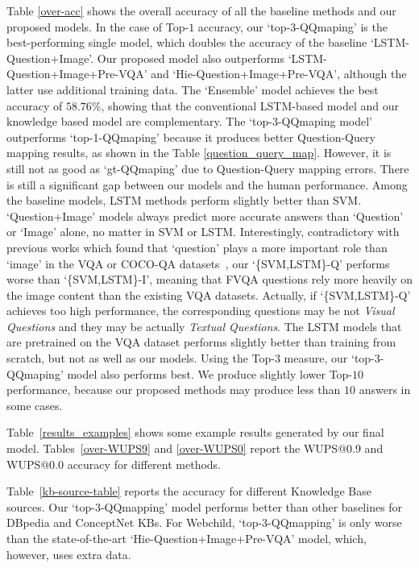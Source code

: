 \documentclass[10pt,journal]{IEEEtran}
\def\bluetext{}
\begin{document}
Table \ref{over-acc} shows the overall accuracy of all the baseline methods and our proposed models. In the case of Top-$1$ accuracy, our `{top-3-QQmaping}' is the best-performing single model, which doubles the accuracy of the baseline `LSTM-Question+Image'. {Our proposed model also outperforms `LSTM-Question+Image+Pre-VQA' and `Hie-Question+Image+Pre-VQA', although the latter use additional training data. The `Ensemble' model achieves the best accuracy of $58.76\%$, showing that the conventional LSTM-based model and our knowledge based model are complementary.} The `top-3-QQmaping model' outperforms `top-1-QQmaping' because it produces better Question-Query mapping results, as shown in the Table \ref{question_query_map}. However, it is still not as good as `gt-QQmaping' due to Question-Query mapping errors. There is still a significant gap between our models and the human performance. Among the baseline models, LSTM methods perform slightly better than SVM. `Question+Image' models always predict more accurate answers than `Question' or `Image' alone, no matter in SVM or LSTM. Interestingly, contradictory with previous works \cite{ren2015image,antol2015vqa} which found that `question' plays a more important role than `image' in the VQA \cite{antol2015vqa} or COCO-QA datasets~\cite{ren2015image}, our `\{SVM,LSTM\}-Q' performs worse than `\{SVM,LSTM\}-I', meaning that FVQA questions rely more heavily on the image content than the existing VQA datasets. Actually, if `\{SVM,LSTM\}-Q' achieves too high performance, the corresponding questions may be not \textit{Visual Questions} and they may be actually \textit{Textual Questions}. { The LSTM models that are pretrained on the VQA dataset performs slightly better than training from scratch, but not as well as our models. Using the Top-$3$ measure, our `{top-3-QQmaping}' model also performs best. We produce slightly lower Top-$10$ performance, because our proposed methods may produce less than $10$ answers in some cases.}


Table~\ref{results_examples} shows some example results generated by our final model. \bluetext{Tables~\ref{over-WUPS9} and \ref{over-WUPS0} report the WUPS@0.9 and WUPS@0.0 accuracy for different methods.}

Table~\ref{kb-source-table} reports the accuracy for different Knowledge Base sources.
Our `top-3-QQmapping' model performs better than other baselines for DBpedia and ConceptNet KBs. 
For Webchild, `top-3-QQmapping' is only worse than the state-of-the-art `Hie-Question+Image+Pre-VQA' model, which, however, uses extra data.
\end{document}
